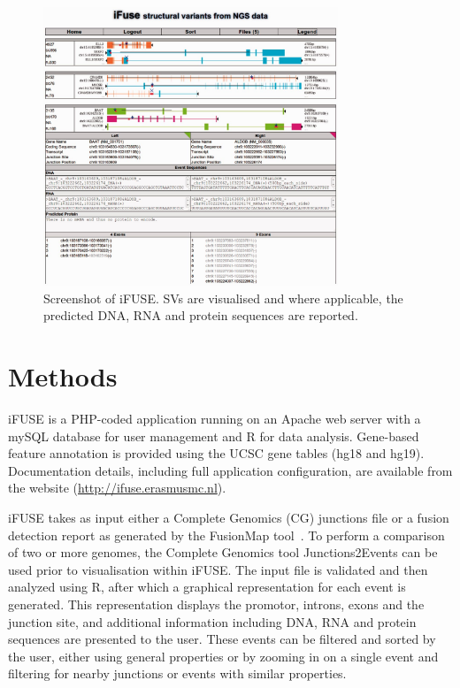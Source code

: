 \begin{figure}
\centerline{\includegraphics[width=250pt]{chapters/images/iFUSE/ifusess.jpeg}}
\caption{Screenshot of iFUSE\@. SVs are visualised and where applicable, the predicted DNA, RNA and protein sequences are reported.}
\label{fig:screenshot}
\end{figure}


\section*{Methods}

iFUSE is a PHP-coded application running on an Apache web server with a mySQL database for user management and R for data analysis. Gene-based feature annotation is provided using the UCSC gene tables (hg18 and hg19). Documentation details, including full application configuration, are available from the website (\href{http://ifuse.erasmusmc.nl}{http://ifuse.erasmusmc.nl}).

iFUSE takes as input either a Complete Genomics (CG) junctions file or a fusion detection report as generated by the FusionMap tool~\cite{ge2011fusionmap}.  To perform a comparison of two or more genomes, the Complete Genomics tool Junctions2Events can be used prior to visualisation within iFUSE\@. \color{black}
The input file is validated and then analyzed using R, after which a graphical representation for each event is generated. This representation displays the promotor, introns, exons and the junction site, and additional information including DNA, RNA and protein sequences are presented to the user. These events can be filtered and sorted by the user, either using general properties or by zooming in on a single event and filtering for nearby junctions or events with similar properties.

